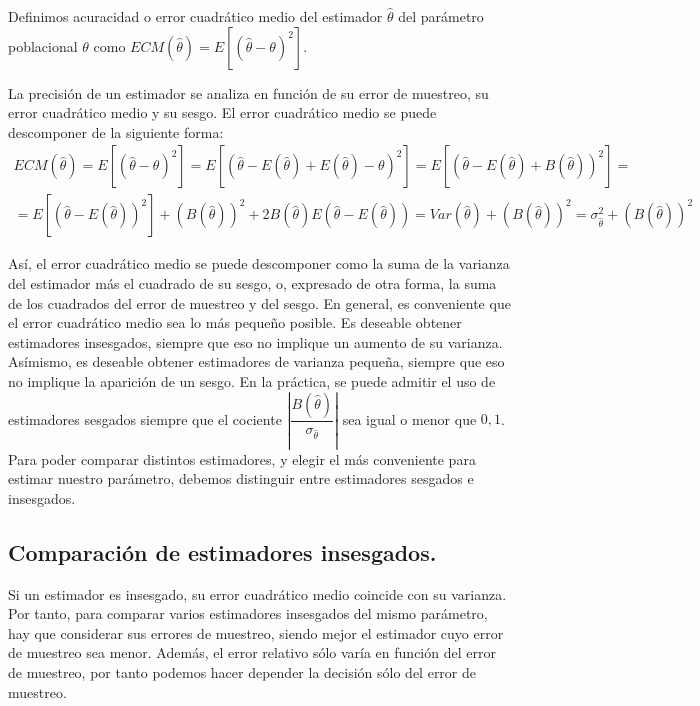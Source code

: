 Definimos acuracidad o error cuadr\'atico medio del estimador $\hat{\theta}$
del par\'ametro poblacional $\theta$ como $ECM\left(\hat{\theta}\right)=E\left[\left(\hat{\theta}-\theta\right)^{2}\right]$.

La precisi\'on de un estimador se analiza en funci\'on de su error de
muestreo, su error cuadr\'atico medio y su sesgo. El error cuadr\'atico
medio se puede descomponer de la siguiente forma: 
\[
\begin{array}{c}
ECM\left(\hat{\theta}\right)=E\left[\left(\hat{\theta}-\theta\right)^{2}\right]=E\left[\left(\hat{\theta}-E\left(\hat{\theta}\right)+E\left(\hat{\theta}\right)-\theta\right)^{2}\right]=E\left[\left(\hat{\theta}-E\left(\hat{\theta}\right)+B\left(\hat{\theta}\right)\right)^{2}\right]=\\
=E\left[\left(\hat{\theta}-E\left(\hat{\theta}\right)\right)^{2}\right]+\left(B\left(\hat{\theta}\right)\right)^{2}+2B\left(\hat{\theta}\right)E\left(\hat{\theta}-E\left(\hat{\theta}\right)\right)=Var\left(\hat{\theta}\right)+\left(B\left(\hat{\theta}\right)\right)^{2}=\sigma_{\hat{\theta}}^{2}+\left(B\left(\hat{\theta}\right)\right)^{2}
\end{array}
\]


As\'i, el error cuadr\'atico medio se puede descomponer como la suma de
la varianza del estimador m\'as el cuadrado de su sesgo, o, expresado
de otra forma, la suma de los cuadrados del error de muestreo y del
sesgo. En general, es conveniente que el error cuadr\'atico medio sea
lo m\'as peque\~no posible. Es deseable obtener estimadores insesgados,
siempre que eso no implique un aumento de su varianza. As\'imismo, es
deseable obtener estimadores de varianza peque\~na, siempre que eso
no implique la aparici\'on de un sesgo. En la pr\'actica, se puede admitir
el uso de estimadores sesgados siempre que el cociente $\left|\dfrac{B\left(\hat{\theta}\right)}{\sigma_{\hat{\theta}}}\right|$
sea igual o menor que $0,1$. Para poder comparar distintos estimadores,
y elegir el m\'as conveniente para estimar nuestro par\'ametro, debemos
distinguir entre estimadores sesgados e insesgados.


\subsection{Comparaci\'on de estimadores insesgados.}

Si un estimador es insesgado, su error cuadr\'atico medio coincide con
su varianza. Por tanto, para comparar varios estimadores insesgados
del mismo par\'ametro, hay que considerar sus errores de muestreo, siendo
mejor el estimador cuyo error de muestreo sea menor. Adem\'as, el error
relativo s\'olo var\'ia en funci\'on del error de muestreo, por tanto podemos
hacer depender la decisi\'on s\'olo del error de muestreo.


